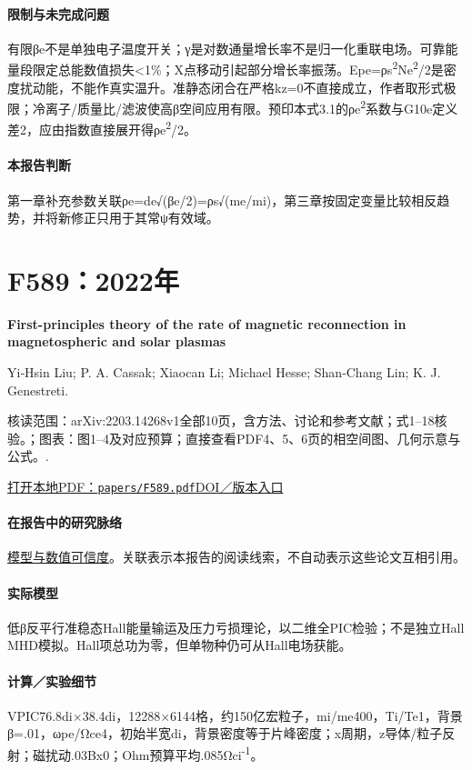 \paragraph{限制与未完成问题}有限βe不是单独电子温度开关；γ是对数通量增长率不是归一化重联电场。可靠能量段限定总能数值损失<1\%；X点移动引起部分增长率振荡。Epe=ρs\textsuperscript{2}Ne\textsuperscript{2}/2是密度扰动能，不能作真实温升。准静态闭合在严格kz=0不直接成立，作者取形式极限；冷离子/质量比/滤波使高β空间应用有限。预印本式3.1的ρe\textsuperscript{2}系数与G10e定义差2，应由指数直接展开得ρe\textsuperscript{2}/2。

\paragraph{本报告判断}第一章补充参数关联ρe=de√(βe/2)=ρs√(me/mi)，第三章按固定变量比较相反趋势，并将新修正只用于其常ψ有效域。

\section{F589：2022年}\label{paper:F589}

\textbf{First-principles theory of the rate of magnetic reconnection in magnetospheric and solar plasmas}\citep{F589}\

Yi‐Hsin Liu;  P. A. Cassak;  Xiaocan Li;  Michael Hesse;  Shan‐Chang Lin;  K. J. Genestreti.

\textsf{核读范围：}arXiv:2203.14268v1全部10页，含方法、讨论和参考文献；式1–18核验。；\textsf{图表：}图1–4及对应预算；直接查看PDF4、5、6页的相空间图、几何示意与公式。.

\href{run:papers/F589.pdf}{打开本地PDF：\texttt{papers/F589.pdf}}\quad\href{https://doi.org/10.1038/s42005-022-00854-x}{DOI／版本入口}

\paragraph{在报告中的研究脉络}\hyperref[ch:numerics]{模型与数值可信度}。关联表示本报告的阅读线索，不自动表示这些论文互相引用。

\paragraph{实际模型}低β反平行准稳态Hall能量输运及压力亏损理论，以二维全PIC检验；不是独立Hall MHD模拟。Hall项总功为零，但单物种仍可从Hall电场获能。

\paragraph{计算／实验细节}VPIC76.8di×38.4di，12288×6144格，约150亿宏粒子，mi/me400，Ti/Te1，背景β=.01，ωpe/Ωce4，初始半宽di，背景密度等于片峰密度；x周期，z导体/粒子反射；磁扰动.03Bx0；Ohm预算平均.085Ωci\textsuperscript{-1}。

